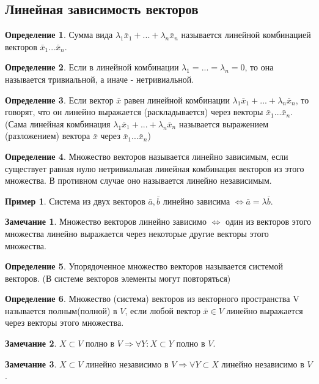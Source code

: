 \documentclass[a4paper, 12pt]{article}
\theoremstyle{definition}
\newtheorem*{definition}{Определение}
\newtheorem*{remark}{Замечание}
\newtheorem*{example}{Пример}
\begin{document}
	\subsection{Линейная зависимость векторов}
	\begin{definition}
		Сумма вида $\lambda_{1}\bar{x}_{1} + ... + \lambda_{n}\bar{x}_{n}$ называется линейной комбинацией векторов $\bar{x}_{1} ... \bar{x}_{n}$.
	\end{definition}
	\begin{definition}
		Если в линейной комбинации $\lambda_{1} = ... = \lambda_{n} = 0$, то она называется тривиальной, а иначе - нетривиальной.
	\end{definition}
	\begin{definition}
		Если вектор $\bar{x}$ равен линейной комбинации $\lambda_{1}\bar{x}_{1} + ... + \lambda_{n}\bar{x}_{n}$, то говорят, что он линейно выражается (раскладывается) через векторы $\bar{x}_{1}...\bar{x}_{n}$.
		(Сама линейная комбинация $\lambda_{1}\bar{x}_{1} + ... + \lambda_{n}\bar{x}_{n}$ называется выражением (разложением) вектора $\bar{x}$ через $\bar{x}_{1}...\bar{x}_{n}$)  
	\end{definition}
	\begin{definition}
		Множество векторов называется линейно зависимым, если существует равная нулю нетривиальная линейная комбинация векторов из этого множества. В противном случае оно называется линейно независимым.
	\end{definition}
	\begin{example}
		Система из двух векторов $\bar{a}, \bar{b}$ линейно зависима $\Leftrightarrow \bar{a} = \lambda\bar{b}$.
	\end{example}
	\begin{remark}
		Множество векторов линейно зависимо $\Leftrightarrow$ один из векторов этого множества линейно выражается через некоторые другие векторы этого множества.
	\end{remark}
	\begin{definition}
		Упорядоченное множество векторов называется системой векторов.
		(В системе векторов элементы могут повторяться)
	\end{definition}
	\begin{definition}
		Множество (система) векторов из векторного пространства V называется полным(полной) в $V$, если любой вектор $\bar{x}\in V$ линейно выражается через векторы этого множества.
	\end{definition}
	\begin{remark}
		$X \subset V$ полно в $V \Rightarrow \forall Y: X\subset Y$ полно в $V$.
	\end{remark}
	\begin{remark}
		$X \subset V$ линейно независимо в $V \Rightarrow \forall Y \subset X$ линейно независимо в $V$.
	\end{remark}
\end{document}
